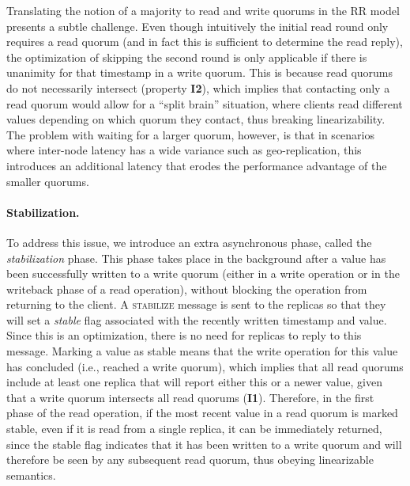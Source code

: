 Translating the notion of a majority to read and write quorums in the
\ac{RR} model presents a subtle challenge. Even though
intuitively the initial read round only requires a read quorum (and in
fact this is sufficient to determine the read reply), the optimization
of skipping the second round is only applicable if there is unanimity
for that timestamp in a write quorum. This is because read quorums do
not necessarily intersect (property \textbf{I2}), which implies that
contacting only a read quorum would allow for a ``split brain''
situation, where clients read different values depending on which
quorum they contact, thus breaking linearizability. The problem with
waiting for a larger quorum, however, is that in scenarios
where inter-node latency has a wide variance such as geo-replication,
this introduces an additional latency that erodes the performance
advantage of the smaller quorums.%




\paragraph{Stabilization.}
To address this issue, we introduce an extra asynchronous phase,
called the \emph{stabilization} phase. This phase takes
place in the background after a value has been successfully
written to a write quorum (either in a write operation or in the
writeback phase of a read operation), without
blocking the operation from returning to the client. A
\textsc{stabilize} message is sent to the replicas so that they
will set a \emph{stable} flag associated with the recently
written timestamp and value. Since this is an optimization, there
is no need for replicas to reply to this message.  Marking a
value as stable means that the write operation for this value has
concluded (i.e., reached a write quorum), which implies that all
read quorums include at least one replica that will report either
this or a newer value, given that a write quorum intersects all
read quorums (\textbf{I1}). Therefore, in the first phase of the
read operation, if the most recent value in a read quorum is
marked stable, even if it is read from a single replica, it can
be immediately returned, since the stable flag indicates that it
has been written to a write quorum and will therefore be seen by
any subsequent read quorum, thus obeying linearizable semantics.

